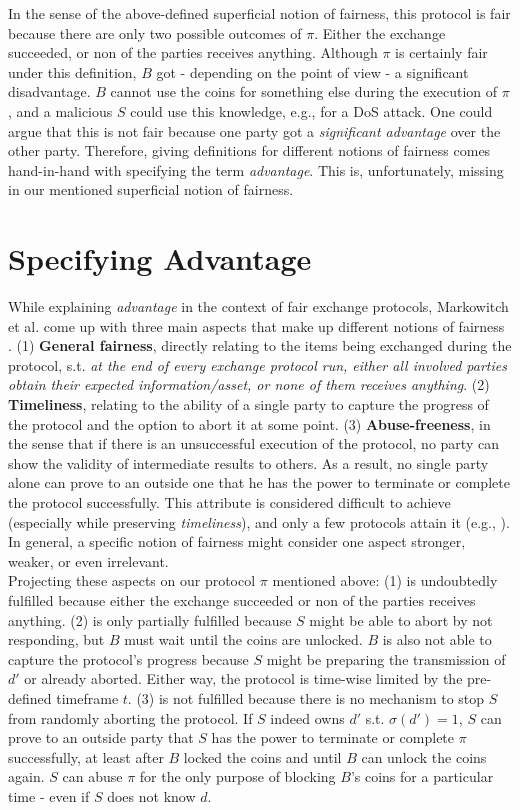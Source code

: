 \documentclass{cacthesis}
\newcounter{protocol}
\begin{document}
        In the sense of the above-defined superficial notion of fairness, this protocol is fair because there are only two possible outcomes of $\pi$. Either the exchange succeeded, or non of the parties receives anything. 
        Although $\pi$ is certainly fair under this definition, $B$ got - depending on the point of view - a significant disadvantage. $B$ cannot use the coins for something else during the execution of $\pi$, and a malicious $S$ could use this knowledge, e.g., for a DoS attack. One could argue that this is not fair because one party got a \textit{significant advantage} over the other party. Therefore, giving definitions for different notions of fairness comes hand-in-hand with specifying the term \textit{advantage}. This is, unfortunately, missing in our mentioned superficial notion of fairness. 
        
        \section{Specifying Advantage}
        \label{sec:Advantage}
        While explaining \textit{advantage} in the context of fair exchange protocols, Markowitch et al. come up with three main aspects that make up different notions of fairness \cite{10.1007/3-540-36552-4_31}. (1) \textbf{General fairness}, directly relating to the items being exchanged during the protocol, s.t. \textit{at the end of every exchange protocol run, either all involved parties obtain their expected information/asset, or none of them receives anything}.  (2) \textbf{Timeliness}, relating to the ability of a single party to capture the progress of the protocol and the option to abort it at some point. (3) \textbf{Abuse-freeness}, in the sense that if there is an unsuccessful execution of the protocol, no party can show the validity of intermediate results to others. As a result, no single party alone can prove to an outside one that he has the power to terminate or complete the protocol successfully. This attribute is considered difficult to achieve (especially while preserving \textit{timeliness}), and only a few protocols attain it (e.g., \cite{Gao2008}). In general, a specific notion of fairness might consider one aspect stronger, weaker, or even irrelevant. \\
        Projecting these aspects on our protocol $\pi$ mentioned above: (1) is undoubtedly fulfilled because either the exchange succeeded or non of the parties receives anything. (2) is only partially fulfilled because $S$ might be able to abort by not responding, but $B$ must wait until the coins are unlocked. $B$ is also not able to capture the protocol's progress because $S$ might be preparing the transmission of $d'$ or already aborted. Either way, the protocol is time-wise limited by the pre-defined timeframe $t$. (3) is not fulfilled because there is no mechanism to stop $S$ from randomly aborting the protocol. If $S$ indeed owns $d'$ s.t. $\sigma\left( d'\right) =1$, $S$ can prove to an outside party that $S$ has the power to terminate or complete $\pi$ successfully, at least after $B$ locked the coins and until $B$ can unlock the coins again. $S$ can abuse $\pi$ for the only purpose of blocking $B$'s coins for a particular time - even if $S$ does not know $d$. 
        
\end{document}
